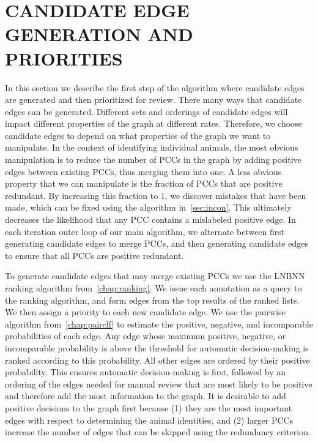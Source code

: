 

\section{CANDIDATE EDGE GENERATION AND PRIORITIES}\label{sec:cand}

In this section we describe the first step of the algorithm where candidate edges are generated and then
  prioritized for review.
There many ways that candidate edges can be generated.
Different sets and orderings of candidate edges will impact different properties of the graph at different rates.
Therefore, we choose candidate edges to depend on what properties of the graph we want to manipulate.
In the context of identifying individual animals, the most obvious manipulation is to reduce the number of PCCs
  in the graph by adding positive edges between existing PCCs, thus merging them into one.
A less obvious property that we can manipulate is the fraction of PCCs that are positive redundant.
By increasing this fraction to $1$, we discover mistakes that have been made, which can be fixed using the
  algorithm in~\cref{sec:incon}.
This ultimately decreases the likelihood that any PCC contains a mislabeled positive edge.
In each iteration outer loop of our main algorithm, we alternate between first generating candidate edges to
  merge PCCs, and then generating candidate edges to ensure that all PCCs are positive redundant.

To generate candidate edges that may merge existing PCCs we use the LNBNN ranking algorithm
  from~\cref{chap:ranking}.
We issue each annotation as a query to the ranking algorithm, and form edges from the top results of the ranked
  lists.
We then assign a priority to each new candidate edge.
We use the pairwise algorithm from~\cref{chap:pairclf} to estimate the positive, negative, and incomparable
  probabilities of each edge.
Any edge whose maximum positive, negative, or incomparable probability is above the threshold for automatic
  decision-making is ranked according to this probability.
All other edges are ordered by their positive probability.
This ensures automatic decision-making is first, followed by an ordering of the edges needed for manual review
  that are most likely to be positive and therefore add the most information to the graph.
It is desirable to add positive decisions to the graph first because
(1) they are the most important edges with respect to determining the animal identities, and
(2) larger PCCs increase the number of edges that can be skipped using the redundancy criterion.

